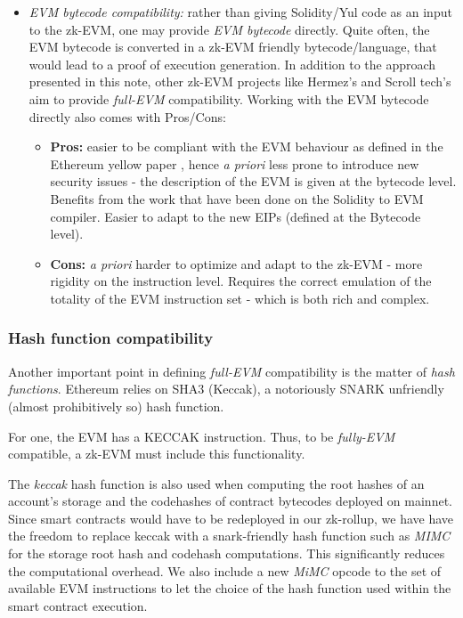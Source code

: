 \begin{itemize}
    \item \textit{EVM bytecode compatibility:} rather than giving Solidity/Yul code as an input to the zk-EVM, one may provide \textit{EVM bytecode} directly. Quite often, the EVM bytecode is converted in a zk-EVM friendly bytecode/language, that would lead to a proof of execution generation. In addition to the approach presented in this note, other zk-EVM projects like Hermez's \cite{hermez} and Scroll tech's \cite{scroll} aim to provide \textit{full-EVM} compatibility. Working with the EVM bytecode directly also comes with Pros/Cons:
    \begin{itemize}
        \item \textbf{Pros:} easier to be compliant with the EVM behaviour as defined in the Ethereum yellow paper \cite{EthYellowpaperBerlin}, hence \textit{a priori} less prone to introduce new security issues - the description of the EVM is given at the bytecode level. Benefits from the work that have been done on the Solidity to EVM compiler. Easier to adapt to the new EIPs (defined at the Bytecode level). 
        \item \textbf{Cons:} \textit{a priori} harder to optimize and adapt to the zk-EVM - more rigidity on the instruction level. Requires the correct emulation of the totality of the EVM instruction set - which is both rich and complex.
    \end{itemize}
\end{itemize}


\subsubsection{Hash function compatibility}
Another important point in defining \textit{full-EVM} compatibility is the matter of \textit{hash functions}. Ethereum relies on SHA3 (Keccak), a notoriously SNARK unfriendly (almost prohibitively so) hash function.

For one, the EVM has a KECCAK instruction. Thus, to be \textit{fully-EVM} compatible, a zk-EVM must include this functionality.

The \textit{keccak} hash function is also used when computing the root hashes of an account's storage and the codehashes of contract bytecodes deployed on mainnet. Since smart contracts would have to be redeployed in our zk-rollup, we have have the freedom to replace keccak with a snark-friendly hash function such as \textit{MIMC} for the storage root hash and codehash computations. This significantly reduces the computational overhead. We also include a new \textit{MiMC} opcode to the set of available EVM instructions to let the choice of the hash function used within the smart contract execution. 

